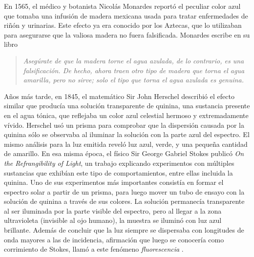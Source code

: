 En 1565, el médico y botanista Nicolás Monardes reportó el peculiar color azul que tomaba una infusión de madera mexicana usada para tratar enfermedades de riñón y urinarias. Este efecto ya era conocido por los Aztecas, que lo utilizaban para asegurarse que la valiosa madera no fuera falsificada. Monardes escribe en su libro \cite{valeur_introduction_2012}

\begin{quote}
    \textit{Asegúrate de que la madera torne el agua azulada, de lo contrario, es una falsificación. De hecho, ahora traen otro tipo de madera que torna el agua amarilla, pero no sirve; solo el tipo que torna el agua azulada es genuina.}
\end{quote}  

\noindent Años más tarde, en 1845, el matemático Sir John Herschel describió el efecto similar que producía una solución transparente de quinina, una sustancia presente en el agua tónica, que reflejaba \flqq un color azul celestial hermoso y extremadamente vívido\frqq.
Herschel usó un prisma para comprobar que la dispersión causada por la quinina sólo se observaba al iluminar la solución con la parte azul del espectro.
El mismo análisis para la luz emitida reveló luz azul, verde, y una pequeña cantidad de amarillo.
En esa misma época, el físico Sir George Gabriel Stokes publicó \textit{On the Refrangibility of Light}, un trabajo explicando experimentos con múltiples sustancias que exhibían este tipo de comportamientos, entre ellas incluida la quinina.
Uno de sus experimentos más importantes consistía en formar el espectro solar a partir de un prisma, para luego mover un tubo de ensayo con la solución de quinina a través de sus colores.
La solución permanecía transparente al ser iluminada por la parte visible del espectro, pero al llegar a la zona ultravioleta (invisible al ojo humano), la muestra se iluminó con luz azul brillante.
Además de concluir que la luz siempre se dispersaba con longitudes de onda mayores a las de incidencia, afirmación que luego se conocería como corrimiento de Stokes, llamó a este fenómeno \textit{fluorescencia} \cite{valeur_introduction_2012}.

